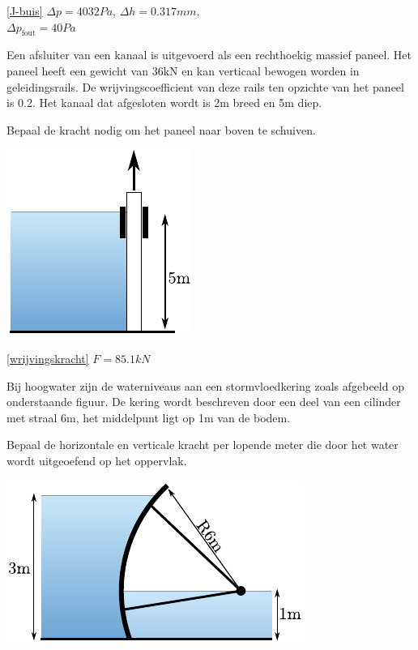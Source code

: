 	\begin{antwoord}{\ref{J-buis}}
		$\Delta p = 4032\unit{Pa}$, $\Delta h = 0.317\unit{mm}$,\\ $\Delta p_{\text{fout}} = 40\unit{Pa}$
	\end{antwoord}
	\begin{toepassing}[*]
		\label{wrijvingskracht}
Een afsluiter van een kanaal is uitgevoerd als een rechthoekig massief paneel. Het paneel heeft een gewicht van 36kN en kan verticaal bewogen worden in geleidingsrails. De wrijvingscoefficient van deze rails ten opzichte van het paneel is 0.2. Het kanaal dat afgesloten wordt is 2m breed en 5m diep.
		
Bepaal de kracht nodig om het paneel naar boven te schuiven.

\centering
\includegraphics{fig/hydrostatica/wrijvingskracht}
	\end{toepassing}
	\begin{antwoord}{\ref{wrijvingskracht}}
		$F = 85.1\unit{kN}$
	\end{antwoord}
	\begin{toepassing}[*]
		\label{stormvloedkering}
Bij hoogwater zijn de waterniveaus aan een stormvloedkering zoals afgebeeld op onderstaande figuur. De kering wordt beschreven door een deel van een cilinder met straal 6m, het middelpunt ligt op 1m van de bodem.
		
Bepaal de horizontale en verticale kracht per lopende meter die door het water wordt uitgeoefend op het oppervlak.

\centering
\includegraphics{fig/hydrostatica/stormvloedkering}
	\end{toepassing}
